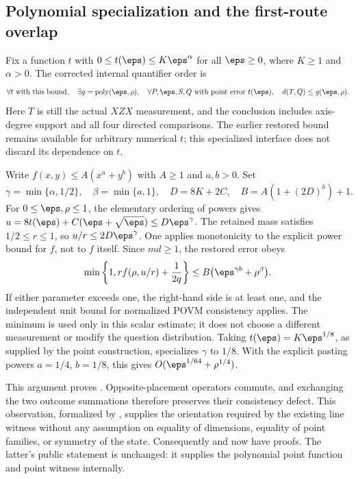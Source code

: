 \documentclass[11pt]{article}
\DeclareMathOperator{\poly}{poly}
\begin{document}
\subsection{Polynomial specialization and the first-route overlap}

Fix a function $t$ with $0\le t(\eps)\le K\eps^\alpha$ for all
$\eps\ge0$, where $K\ge1$ and $\alpha>0$. The corrected internal
quantifier order is
\[
  \forall t\text{ with this bound},\quad
  \exists g=\poly(\eps,\rho),\quad
  \forall P,\eps,S,Q\text{ with point error }t(\eps),\quad
  d(T,Q)\le g(\eps,\rho).
\]
Here $T$ is still the actual $XZX$ measurement, and the conclusion includes
axis-degree support and all four directed comparisons. The earlier
restored bound remains available for arbitrary numerical $t$; this
specialized interface does not discard its dependence on $t$.

Write $f(x,y)\le A(x^a+y^b)$ with $A\ge1$ and $a,b>0$. Set
\[
 \gamma=\min\{\alpha,1/2\},\quad \beta=\min\{a,1\},\quad
 D=8K+2C,\quad B=A(1+(2D)^b)+1.
\]
For $0\le\eps,\rho\le1$, the elementary ordering of powers gives
$u=8t(\eps)+C(\eps+\sqrt\eps)\le D\eps^\gamma$.
The retained mass satisfies $1/2\le r\le1$, so $u/r\le2D\eps^\gamma$.
One applies monotonicity to the explicit power bound for $f$, not to $f$
itself. Since $md\ge1$, the restored error obeys
\[
 \min\left\{1,r f(\rho,u/r)+\frac1{2q}\right\}
 \le B\bigl(\eps^{\gamma b}+\rho^\beta\bigr).
\]
If either parameter exceeds one, the right-hand side is at least one,
and the independent unit bound for normalized POVM consistency applies.
The minimum is used only in this scalar estimate; it does not choose a
different measurement or modify the question distribution. Taking
$t(\eps)=K\eps^{1/8}$, as supplied by the point construction, specializes
$\gamma$ to $1/8$. With the explicit pasting powers $a=1/4$, $b=1/8$,
this gives $O(\eps^{1/64}+\rho^{1/4})$.

This argument proves
.
Opposite-placement operators commute, and exchanging the two outcome
summations therefore preserves their consistency defect. This observation,
formalized by
, supplies the
orientation required by the existing line witness without any assumption
on equality of dimensions, equality of point families, or symmetry of the
state. Consequently
and  now have proofs.
The latter's public statement is unchanged: it supplies the polynomial
point function and point witness internally.
\end{document}
